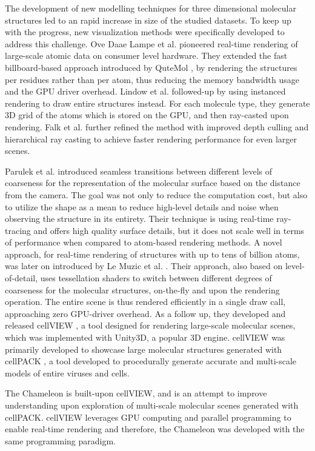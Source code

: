\documentclass[review,journal]{vgtc}         %
\begin{document}
The development of new modelling techniques for three dimensional molecular structures led to an rapid increase in size of the studied datasets.
To keep up with the progress, new visualization methods were specifically developed to address this challenge.
Ove Daae Lampe et al.\cite{lampe2007two} pioneered real-time rendering of large-scale atomic data on consumer level hardware. 
They extended the fast billboard-based approach introduced by QuteMol \cite{tarini2006ambient}, by rendering the structures per residues rather than per atom, thus reducing the memory bandwidth usage and the GPU driver overhead. 
Lindow et al. \cite{lindow2012interactive} followed-up by using  instanced rendering to draw entire structures instead.
For each molecule type, they generate 3D grid of the atoms which is stored on the GPU, and then ray-casted upon rendering.
Falk et al. \cite{falk2013atomistic} further refined the method with improved depth culling and hierarchical ray casting to achieve faster rendering performance for even larger scenes. 

Parulek et al.\cite{parulek2014continuous} introduced seamless transitions between different levels of coarseness for the representation of the molecular surface based on the distance from the camera.
The goal was not only to reduce the computation cost, but also to utilize the shape as a mean to reduce high-level details and noise when observing the structure in its entirety.
Their technique is using real-time ray-tracing and offers high quality surface details, but it does not scale well in terms of performance when compared to atom-based rendering methods.
A novel approach, for real-time rendering of structures with up to tens of billion atoms, was later on introduced by Le Muzic et al. \cite{le2014illustrative}. 
Their approach, also based on level-of-detail, uses tessellation shaders to switch between different degrees of coarseness for the molecular structures, on-the-fly and upon the rendering operation.
The entire scene is thus rendered efficiently in a single draw call, approaching zero GPU-driver overhead. 
As a follow up, they developed and released cellVIEW \cite{muzic2015cellview}, a tool designed for rendering large-scale molecular scenes, which was implemented with Unity3D, a popular 3D engine.
cellVIEW was primarily developed to showcase large molecular structures generated with cellPACK \cite{johnson2015cellpack}, a tool developed to procedurally generate accurate and multi-scale models of entire viruses and cells.

The Chameleon is built-upon cellVIEW, and is an attempt to improve understanding upon exploration of multi-scale molecular scenes generated with cellPACK.
cellVIEW leverages GPU computing and parallel programming to enable real-time rendering and therefore, the Chameleon was developed with the same programming paradigm.
\end{document}
